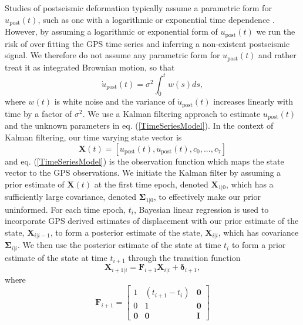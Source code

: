 Studies of postseismic deformation typically assume a parametric form for $u_\mathrm{post}(t)$, such as one with a logarithmic or exponential time dependence \citep[e.g.][]{Savage2005a}.  However, by assuming a logarithmic or exponential form of $u_\mathrm{post}(t)$ we run the risk of over fitting the GPS time series and inferring a non-existent postseismic signal. We therefore do not assume any parametric form for $u_\mathrm{post}(t)$ and rather treat it as integrated Brownian motion, so that 
\begin{equation}
    \dot{u}_\mathrm{post}(t) = \sigma^2\int_0^t w(s) ds,
\end{equation}    
where $w(t)$ is white noise and the variance of $\dot{u}_\mathrm{post}(t)$ increases linearly with time by a factor of $\sigma^2$. We use a Kalman filtering approach to estimate $u_\mathrm{post}(t)$ and the unknown parameters in eq. (\ref{TimeSeriesModel}).  In the context of Kalman filtering, our time varying state vector is
\begin{equation}
    \mathbf{X}(t) = [u_\mathrm{post}(t),\dot u_\mathrm{post}(t), c_0, ..., c_7]
\end{equation}
and eq. (\ref{TimeSeriesModel}) is the observation function which maps the state vector to the GPS observations. We initiate the Kalman filter by assuming a prior estimate of $\mathbf{X}(t)$ at the first time epoch, denoted $\mathbf{X}_{1|0}$, which has a sufficiently large covariance, denoted $\mathbf{\Sigma}_{1|0}$, to effectively make our prior uninformed.  For each time epoch, $t_i$, Bayesian linear regression is used to incorporate GPS derived estimates of displacement with our prior estimate of the state, $\mathbf{X}_{i|i-1}$, to form a posterior estimate of the state, $\mathbf{X}_{i|i}$, which has covariance $\mathbf{\Sigma}_{i|i}$.  We then use the posterior estimate of the state at time $t_i$ to form a prior estimate of the state at time $t_{i+1}$ through the transition function
\begin{equation}\label{predict}
  \mathbf{X}_{i+1|i} = \mathbf{F}_{i+1}\mathbf{X}_{i|i} + \mathbf{\delta}_{i+1}, 
\end{equation}
where 
\begin{equation}
  \mathbf{F}_{i+1} = 
  \left[
  \begin{array}{ccc}
    1           & (t_{i+1} - t_i) & \mathbf{0}\\
    0           & 1              & \mathbf{0}\\
    \mathbf{0}  & \mathbf{0}     & \mathbf{I}
  \end{array}
  \right]
\end{equation}
